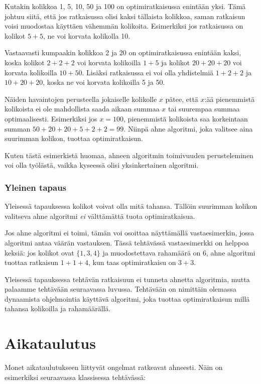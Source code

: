 Kutakin kolikkoa 1, 5, 10, 50 ja 100
on optimiratkaisussa enintään yksi.
Tämä johtuu siitä, että jos
ratkaisussa olisi kaksi tällaista kolikkoa,
saman ratkaisun voisi muodostaa
käyttäen vähemmän kolikoita.
Esimerkiksi jos ratkaisussa on
kolikot $5+5$, ne voi korvata kolikolla 10.

Vastaavasti kumpaakin kolikkoa 2 ja 20
on optimiratkaisussa enintään kaksi,
koska kolikot $2+2+2$ voi korvata kolikoilla $1+5$
ja kolikot $20+20+20$ voi korvata kolikoilla $10+50$.
Lisäksi ratkaisussa ei voi olla yhdistelmiä
$1+2+2$ ja $10+20+20$,
koska ne voi korvata kolikoilla 5 ja 50.

Näiden havaintojen perusteella
jokaiselle kolikolle $x$ pätee,
että $x$:ää pienemmistä kolikoista
ei ole mahdollista saada aikaan summaa
$x$ tai suurempaa summaa optimaalisesti.
Esimerkiksi jos $x=100$, pienemmistä kolikoista
saa korkeintaan summan $50+20+20+5+2+2=99$.
Niinpä ahne algoritmi,
joka valitsee aina suurimman kolikon,
tuottaa optimiratkaisun.

Kuten tästä esimerkistä huomaa,
ahneen algoritmin toimivuuden perusteleminen
voi olla työlästä,
vaikka kyseessä olisi yksinkertainen algoritmi.

\subsubsection{Yleinen tapaus}

Yleisessä tapauksessa kolikot voivat olla mitä tahansa.
Tällöin suurimman kolikon valitseva ahne algoritmi
\emph{ei} välttämättä tuota optimiratkaisua.

Jos ahne algoritmi ei toimi, tämän voi osoittaa
näyttämällä vastaesimerkin, jossa algoritmi
antaa väärän vastauksen.
Tässä tehtävässä vastaesimerkki on helppoa keksiä:
jos kolikot ovat $\{1,3,4\}$ ja muodostettava
rahamäärä on 6, ahne algoritmi tuottaa ratkaisun
$1+1+4$, kun taas optimiratkaisu on $3+3$.

Yleisessä tapauksessa tehtävän ratkaisuun
ei tunneta ahnetta algoritmia,
mutta palaamme tehtävään seuraavassa luvussa.
Tehtävään on nimittäin olemassa dynaamista
ohjelmointia käyttävä algoritmi,
joka tuottaa optimiratkaisun
millä tahansa kolikoilla ja rahamäärällä.

\section{Aikataulutus}

Monet aikataulutukseen liittyvät ongelmat
ratkeavat ahneesti.
Näin on esimerkiksi seuraavassa klassisessa tehtävässä:

